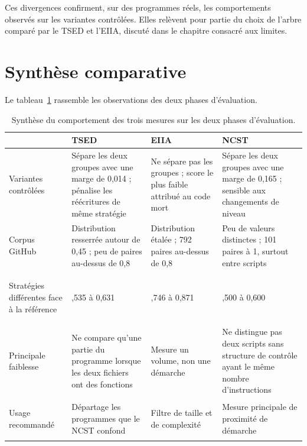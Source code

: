 \documentclass[12pt,a4paper,oneside]{report}
\begin{document}
Ces divergences confirment, sur des programmes réels, les comportements
observés sur les variantes contrôlées. Elles relèvent pour partie du choix de
l'arbre comparé par le TSED et l'EIIA, discuté dans le chapitre consacré
aux limites.

\section{Synthèse comparative}

Le tableau~\ref{tab:synthese_resultats} rassemble les observations des deux
phases d'évaluation.

\begin{table}[htbp]
\centering
\small
\renewcommand{\arraystretch}{1.25}
\begin{tabularx}{\textwidth}{>{\bfseries\raggedright\arraybackslash}p{2.7cm}>{\raggedright\arraybackslash}X>{\raggedright\arraybackslash}X>{\raggedright\arraybackslash}X}
\toprule
 & \textcolor{tsedcol}{TSED} & \textcolor{eiiacol}{EIIA} &
 \textcolor{ncstcol}{NCST} \\
\midrule
Variantes contrôlées &
  Sépare les deux groupes avec une marge de 0,014 ; pénalise les
  réécritures de même stratégie &
  Ne sépare pas les groupes ; score le plus faible attribué au code mort &
  Sépare les deux groupes avec une marge de 0,165 ; sensible aux
  changements de niveau \\
Corpus GitHub &
  Distribution resserrée autour de 0,45 ; peu de paires au-dessus de 0,8 &
  Distribution étalée ; 792 paires au-dessus de 0,8 &
  Peu de valeurs distinctes ; 101 paires à 1, surtout entre scripts \\
Stratégies différentes face à la référence & 0,535 à 0,631 & 0,746 à 0,871 &
  0,500 à 0,600 \\
Principale faiblesse &
  Ne compare qu'une partie du programme lorsque les deux fichiers ont des
  fonctions &
  Mesure un volume, non une démarche &
  Ne distingue pas deux scripts sans structure de contrôle ayant le même
  nombre d'instructions \\
Usage recommandé &
  Départage les programmes que le NCST confond &
  Filtre de taille et de complexité &
  Mesure principale de proximité de démarche \\
\bottomrule
\end{tabularx}
\caption{Synthèse du comportement des trois mesures sur les deux phases
d'évaluation.}
\label{tab:synthese_resultats}
\end{table}
\end{document}
